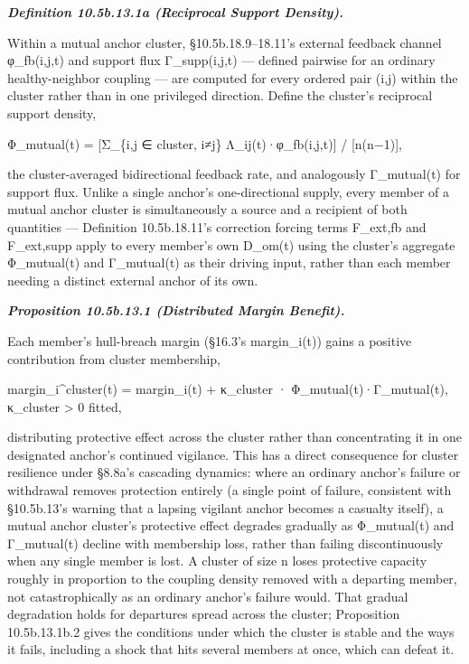 \documentclass[
]{article}
\begin{document}
\emph{\textbf{Definition 10.5b.13.1a (Reciprocal Support Density).}}

Within a mutual anchor cluster, §10.5b.18.9--18.11's external feedback
channel φ\_fb(i,j,t) and support flux Γ\_supp(i,j,t) --- defined
pairwise for an ordinary healthy-neighbor coupling --- are computed for
every ordered pair (i,j) within the cluster rather than in one
privileged direction. Define the cluster's reciprocal support density,

Φ\_mutual(t) = {[}Σ\_\{i,j ∈ cluster, i≠j\} Λ\_ij(t)·φ\_fb(i,j,t){]} /
{[}n(n−1){]},

the cluster-averaged bidirectional feedback rate, and analogously
Γ\_mutual(t) for support flux. Unlike a single anchor's one-directional
supply, every member of a mutual anchor cluster is simultaneously a
source and a recipient of both quantities --- Definition 10.5b.18.11's
correction forcing terms F\_ext,fb and F\_ext,supp apply to every
member's own D\_om(t) using the cluster's aggregate Φ\_mutual(t) and
Γ\_mutual(t) as their driving input, rather than each member needing a
distinct external anchor of its own.

\emph{\textbf{Proposition 10.5b.13.1 (Distributed Margin Benefit).}}

Each member's hull-breach margin (§16.3's margin\_i(t)) gains a positive
contribution from cluster membership,

margin\_i\^{}cluster(t) = margin\_i(t) + κ\_cluster ·
Φ\_mutual(t)·Γ\_mutual(t), κ\_cluster \textgreater{} 0 fitted,

distributing protective effect across the cluster rather than
concentrating it in one designated anchor's continued vigilance. This
has a direct consequence for cluster resilience under §8.8a's cascading
dynamics: where an ordinary anchor's failure or withdrawal removes
protection entirely (a single point of failure, consistent with
§10.5b.13's warning that a lapsing vigilant anchor becomes a casualty
itself), a mutual anchor cluster's protective effect degrades gradually
as Φ\_mutual(t) and Γ\_mutual(t) decline with membership loss, rather
than failing discontinuously when any single member is lost. A cluster
of size n loses protective capacity roughly in proportion to the
coupling density removed with a departing member, not catastrophically
as an ordinary anchor's failure would. That gradual degradation holds
for departures spread across the cluster; Proposition 10.5b.13.1b.2
gives the conditions under which the cluster is stable and the ways it
fails, including a shock that hits several members at once, which can
defeat it.
\end{document}
